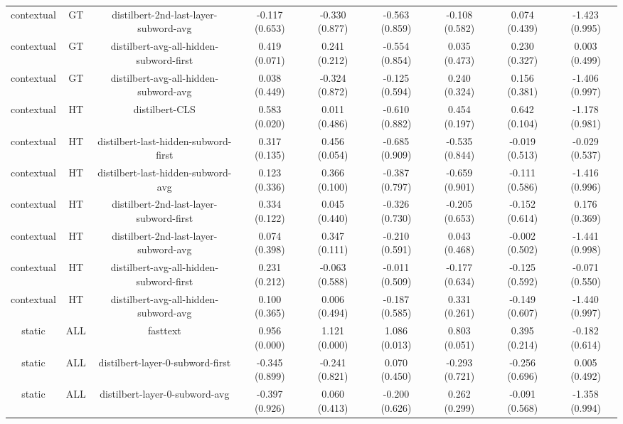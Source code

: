 \begin{sidewaystable}[htb]
\begin{tabular}{@{}ccccccccc@{}}
        contextual & GT & distilbert-2nd-last-layer-subword-avg & -0.117 (0.653) & -0.330 (0.877) & -0.563 (0.859) & -0.108 (0.582) & 0.074 (0.439) & -1.423 (0.995) \\
        contextual & GT & distilbert-avg-all-hidden-subword-first & 0.419 (0.071) & 0.241 (0.212) & -0.554 (0.854) & 0.035 (0.473) & 0.230 (0.327) & 0.003 (0.499) \\
        contextual & GT & distilbert-avg-all-hidden-subword-avg & 0.038 (0.449) & -0.324 (0.872) & -0.125 (0.594) & 0.240 (0.324) & 0.156 (0.381) & -1.406 (0.997) \\
        contextual & HT & distilbert-CLS & 0.583 (0.020) & 0.011 (0.486) & -0.610 (0.882) & 0.454 (0.197) & 0.642 (0.104) & -1.178 (0.981) \\
        contextual & HT & distilbert-last-hidden-subword-first & 0.317 (0.135) & 0.456 (0.054) & -0.685 (0.909) & -0.535 (0.844) & -0.019 (0.513) & -0.029 (0.537) \\
        contextual & HT & distilbert-last-hidden-subword-avg & 0.123 (0.336) & 0.366 (0.100) & -0.387 (0.797) & -0.659 (0.901) & -0.111 (0.586) & -1.416 (0.996) \\
        contextual & HT & distilbert-2nd-last-layer-subword-first & 0.334 (0.122) & 0.045 (0.440) & -0.326 (0.730) & -0.205 (0.653) & -0.152 (0.614) & 0.176 (0.369) \\
        contextual & HT & distilbert-2nd-last-layer-subword-avg & 0.074 (0.398) & 0.347 (0.111) & -0.210 (0.591) & 0.043 (0.468) & -0.002 (0.502) & -1.441 (0.998) \\
        contextual & HT & distilbert-avg-all-hidden-subword-first & 0.231 (0.212) & -0.063 (0.588) & -0.011 (0.509) & -0.177 (0.634) & -0.125 (0.592) & -0.071 (0.550) \\
        contextual & HT & distilbert-avg-all-hidden-subword-avg & 0.100 (0.365) & 0.006 (0.494) & -0.187 (0.585) & 0.331 (0.261) & -0.149 (0.607) & -1.440 (0.997) \\
        static & ALL & fasttext & 0.956 (0.000) & 1.121 (0.000) & 1.086 (0.013) & 0.803 (0.051) & 0.395 (0.214) & -0.182 (0.614) \\
        static & ALL & distilbert-layer-0-subword-first & -0.345 (0.899) & -0.241 (0.821) & 0.070 (0.450) & -0.293 (0.721) & -0.256 (0.696) & 0.005 (0.492) \\
        static & ALL & distilbert-layer-0-subword-avg & -0.397 (0.926) & 0.060 (0.413) & -0.200 (0.626) & 0.262 (0.299) & -0.091 (0.568) & -1.358 (0.994) \\

\end{tabular}
\end{sidewaystable}
